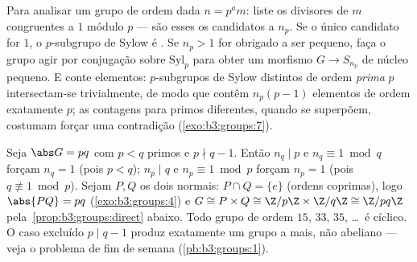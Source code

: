 \begin{method}\label{met:b3:groups:sylowmethod}
Para analisar um grupo de ordem dada $n = p^a m$: liste os divisores de
$m$ congruentes a $1$ módulo $p$ --- são esses os
candidatos a $n_p$. Se o único candidato for $1$, o
$p$-subgrupo de Sylow é . Se $n_p > 1$ for obrigado a ser
pequeno, faça o grupo agir por conjugação sobre $\mathrm{Syl}_p$ para obter um
morfismo $G \to S_{n_p}$ de núcleo pequeno. E conte elementos: $p$-subgrupos
de Sylow distintos de ordem \emph{prima} $p$ intersectam-se
trivialmente, de modo que contêm $n_p(p-1)$ elementos de ordem exatamente
$p$; as contagens para primos diferentes, quando se superpõem,
costumam forçar uma contradição (\cref{exo:b3:groups:7}).
\end{method}

\begin{example}\label{ex:b3:groups:pq}
Seja $\abs G = pq$ com $p < q$ primos e $p \nmid q - 1$. Então $n_q \mid p$ e $n_q \equiv 1 \bmod q$ forçam
$n_q = 1$ (pois $p <
q$); $n_p \mid q$ e $n_p \equiv 1 \bmod p$ forçam $n_p = 1$ (pois $q
\not\equiv 1 \bmod p$).
Sejam $P, Q$ os dois  normais: $P
\cap Q = \{e\}$ (ordens
coprimas), logo $\abs{PQ} = pq$ (\cref{exo:b3:groups:4}) e $G \cong P \times Q \cong \Z/p\Z
\times \Z/q\Z \cong \Z/pq\Z$ pela~\cref{prop:b3:groups:direct}
abaixo. Todo grupo de ordem $15$, $33$, $35$, \dots\ é
cíclico. O caso excluído $p \mid q - 1$ produz exatamente um grupo a mais, não
abeliano --- veja o problema de fim de semana (\cref{pb:b3:groups:1}).
\end{example}

